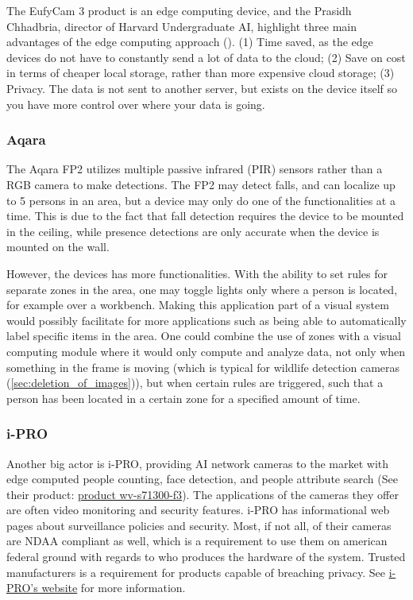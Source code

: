 The EufyCam 3 product is an edge computing device, and the Prasidh Chhadbria, director of Harvard Undergraduate AI, highlight three main advantages of the edge computing approach (\citeyear{ch2022youtube_edge_computing_eufycam}). (1) Time saved, as the edge devices do not have to constantly send a lot of data to the cloud; (2) Save on cost in terms of cheaper local storage, rather than more expensive cloud storage; (3) Privacy. The data is not sent to another server, but exists on the device itself so you have more control over where your data is going.


\subsubsection{Aqara}
The Aqara FP2 utilizes multiple passive infrared (PIR) sensors rather than a RGB camera to make detections. The FP2 may detect falls, and can localize up to 5 persons in an area, but a device may only do one of the functionalities at a time. This is due to the fact that fall detection requires the device to be mounted in the ceiling, while presence detections are only accurate when the device is mounted on the wall. 

However, the devices has more functionalities. With the ability to set rules for separate zones in the area, one may toggle lights only where a person is located, for example over a workbench. Making this application part of a visual system would possibly facilitate for more applications such as being able to automatically label specific items in the area. One could combine the use of zones with a visual computing module where it would only compute and analyze data, not only when something in the frame is moving (which is typical for wildlife detection cameras (\ref{sec:deletion_of_images})), but when certain rules are triggered, such that a person has been located in a certain zone for a specified amount of time.   

\subsubsection{i-PRO}
Another big actor is i-PRO, providing AI network cameras to the market with edge computed people counting, face detection, and people attribute search 
(See their product: \href{https://i-pro.com/products_and_solutions/en/surveillance/products/wv-s71300-f3}{product wv-s71300-f3}). The applications of the cameras they offer are often video monitoring and security features. i-PRO has informational web pages about surveillance policies and security. Most, if not all, of their cameras are NDAA compliant as well, which is a requirement to use them on american federal ground with regards to who produces the hardware of the system. Trusted manufacturers is a requirement for products capable of breaching privacy. See \href{https://i-pro.com/}{i-PRO's website} for more information.

